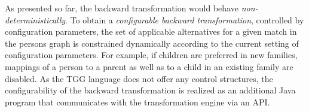 As presented so far, the backward transformation would behave \emph{non-deterministically}. To obtain a \emph{configurable backward transformation}, controlled by configuration parameters, the set of applicable alternatives for a given match in the persons graph is constrained dynamically according to the current setting of configuration parameters.
For example, if children are preferred in new families, mappings of a person to a parent as well as to a child in an existing family are disabled.
As the TGG language does not offer any control structures, the configurability of the backward transformation is realized as an additional Java program that communicates with the transformation engine via an API. 

